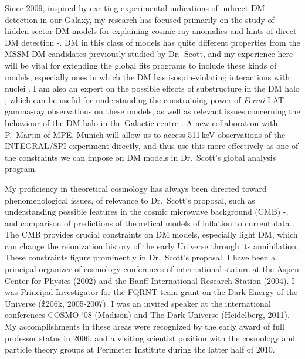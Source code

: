 \documentclass[12pt]{article}
\begin{document}
Since 2009, inspired by exciting experimental indications of indirect
DM detection in our Galaxy, my research has focused primarily
on the study of hidden sector DM models for explaining cosmic
ray anomalies and hints of direct DM detection
\cite{Chen:2009dm}-\cite{Cline:2011uu}.  DM in this class of models
has quite different properties from the MSSM DM candidates previously
studied by Dr.\ Scott, and my experience here will be vital for
extending the global fits programs to include these kinds of models,
especially ones in which the DM has isospin-violating interactions
with nuclei \cite{Cline:2011zr,Cline:2011uu}.  I am also an expert on
the possible effects of substructure in the DM halo 
\cite{Cline:2010ag,Vincent:2010kv}, which can be useful for
understanding the constraining power of \emph{Fermi}-LAT gamma-ray
observations on these models, as well as relevant issues concerning
the behaviour of the DM halo in the Galactic centre
\cite{Chen:2009av,Cirelli:2010nh}. A new collaboration with P.\
Martin of MPE, Munich will allow us to access 511\,keV observations of
the INTEGRAL/SPI experiment directly, and thus use this more
effectively as one of the constraints we can impose on  DM models in
Dr.\ Scott's global analysis program.

My proficiency in theoretical cosmology has always been directed toward
phenomenological issues, of relevance to Dr.\ Scott's proposal, such
as understanding possible features in the cosmic microwave background
(CMB) \cite{Cline:2006db}-\cite{Burgess:2002ub}, and comparison of
predictions of theoretical models of inflation to current data
\cite{BlancoPillado:2006he,BlancoPillado:2004ns}. The CMB provides
crucial constraints on DM models, especially light DM, which can change the reionization history of the early
Universe through its annihilation.  These constraints figure prominently in Dr.\ Scott's proposal. I have
been a principal organizer of cosmology conferences of international 
stature at the Aspen Center for Physics (2002) and the Banff
International Research Station (2004).  I was Principal Investigator
for the FQRNT team grant on the Dark Energy of the Universe 
(\$206k, 2005-2007).   I was an invited speaker at the 
international conferences COSMO `08 (Madison) and The Dark Universe
(Heidelberg, 2011).  My accomplishments in these
areas were recognized by the early award of full professor status
in 2006, and a visiting scientist position with the cosmology and particle theory
groups at Perimeter Institute during the latter half of 2010.
\end{document}
